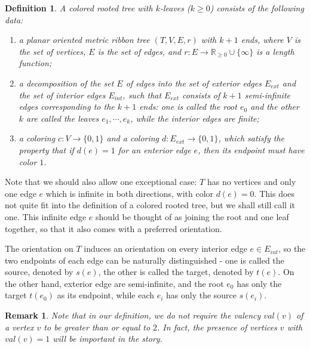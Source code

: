 \documentclass{amsart}
\newtheorem{definition}[theorem]{Definition}
\newtheorem{remark}[theorem]{Remark}
\numberwithin{equation}{section}
\numberwithin{figure}{section}
\begin{document}
\begin{definition}
	A colored rooted tree with $k$-leaves ($k \ge 0$) consists of the following data:
\begin{enumerate}[label=(\roman*)]

\item a planar oriented metric ribbon tree $(T, V, E, r)$ with $k+1$ ends, where $V$ is the set of vertices, $E$ is the set of edges, and $r: E \to \mathbb{R}_{\ge 0} \cup \{\infty\}$ is a length function;

\item a decomposition of the set $E$ of edges into the set of exterior edges $E_{ext}$ and the set of interior edges $E_{int}$, such that $E_{ext}$ consists of $k+1$ semi-infinite edges corresponding to the $k+1$ ends: one is called the root $e_{0}$ and the other $k$ are called the leaves $e_{1}, \cdots, e_{k}$, while the interior edges are finite;

\item a coloring $c: V \to \{0, 1\}$ and a coloring $d: E_{ext} \to \{0, 1\}$, which satisfy the property that if $d(e) = 1$ for an enterior edge $e$, then its endpoint must have color $1$.

\end{enumerate}
\end{definition}

	Note that we should also allow one exceptional case: $T$ has no vertices and only one edge $e$ which is infinite in both directions, with color $d(e) = 0$. This does not quite fit into the definition of a colored rooted tree, but we shall still call it one. This infinite edge $e$ should be thought of as joining the root and one leaf together, so that it also comes with a preferred orientation. \par
	The orientation on $T$ induces an orientation on every interior edge $e \in E_{int}$, so the two endpoints of each edge can be naturally distinguished - one is called the source, denoted by $s(e)$, the other is called the target, denoted by $t(e)$. On the other hand, exterior edge are semi-infinite, and the root $e_{0}$ has only the target $t(e_{0})$ as its endpoint, while each $e_{i}$ has only the source $s(e_{i})$. \par

\begin{remark}
	Note that in our definition, we do not require the valency $val(v)$ of a vertex $v$ to be greater than or equal to $2$. In fact, the presence of vertices $v$ with $val(v) = 1$ will be important in the story.
\end{remark}
\end{document}
